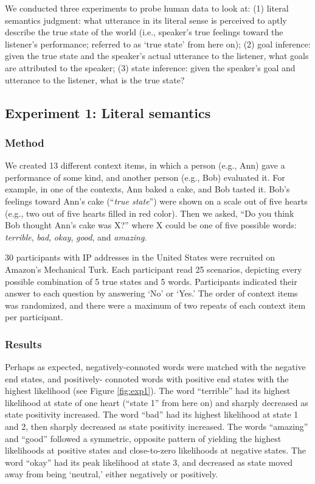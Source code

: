 \documentclass[10pt,letterpaper]{article}
\begin{document}
We conducted three experiments to probe human data to look at: (1) literal semantics judgment: what utterance in its literal sense is perceived to aptly describe the true state of the world (i.e., speaker's true feelings toward the listener's performance; referred to as `true state' from here on); (2) goal inference: given the true state and the speaker's actual utterance to the listener, what goals are attributed to the speaker; (3) state inference: given the speaker's goal and utterance to the listener, what is the true state?

\subsection{Experiment 1: Literal semantics}

\subsubsection{Method}

We created 13 different context items, in which a person (e.g., Ann) gave a performance of some kind, and another person (e.g., Bob) evaluated it. For example, in one of the contexts, Ann baked a cake, and Bob tasted it. Bob's feelings toward Ann's cake (``\emph{true state}'') were shown on a scale out of five hearts (e.g., two out of five hearts filled in red color). Then we asked, ``Do you think Bob thought Ann's cake was X?'' where X could be one of five possible words: \emph{terrible}, \emph{bad}, \emph{okay}, \emph{good}, and \emph{amazing}.

30 participants with IP addresses in the United States were recruited on Amazon's Mechanical Turk. Each participant read 25 scenarios, depicting every possible combination of 5 true states and 5 words. Participants indicated their answer to each question by answering `No' or `Yes.' The order of context items was randomized, and there were a maximum of two repeats of each context item per participant.

\subsubsection{Results}

Perhaps as expected, negatively-connoted words were matched with the negative end states, and positively- connoted words with positive end states with the highest likelihood (see Figure \ref{fig:exp1}). The word ``terrible'' had its highest likelihood at state of one heart (``state 1'' from here on) and sharply decreased as state positivity increased. The word ``bad'' had its highest likelihood at state 1 and 2, then sharply decreased as state positivity increased. The words ``amazing'' and ``good'' followed a symmetric, opposite pattern of yielding the highest likelihoods at positive states and close-to-zero likelihoods at negative states. The word ``okay'' had its peak likelihood at state 3, and decreased as state moved away from being ‘neutral,' either negatively or positively.
\end{document}

